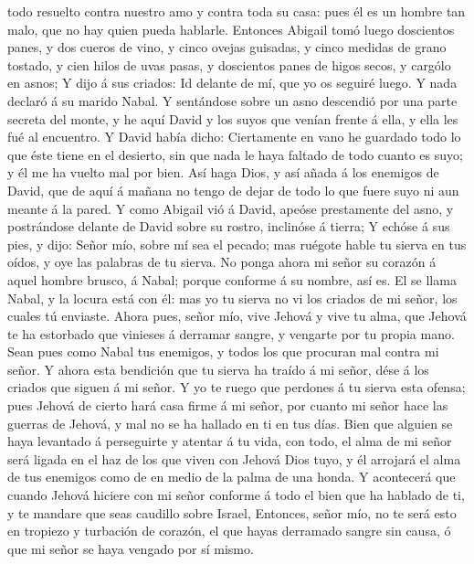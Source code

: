 todo resuelto contra nuestro amo y contra toda su casa: pues él es un
hombre tan malo, que no hay quien pueda hablarle. 
Entonces Abigail tomó luego doscientos panes, y dos cueros de vino, y
cinco ovejas guisadas, y cinco medidas de grano tostado, y cien hilos de
uvas pasas, y doscientos panes de higos secos, y cargólo en asnos;
 Y dijo á sus criados: Id delante de mí, que yo os
seguiré luego. Y nada declaró á su marido Nabal.  Y
sentándose sobre un asno descendió por una parte secreta del monte, y he
aquí David y los suyos que venían frente á ella, y ella les fué al
encuentro.  Y David había dicho: Ciertamente en vano he
guardado todo lo que éste tiene en el desierto, sin que nada le haya
faltado de todo cuanto es suyo; y él me ha vuelto mal por bien.
 Así haga Dios, y así añada á los enemigos de David, que
de aquí á mañana no tengo de dejar de todo lo que fuere suyo ni aun
meante á la pared.  Y como Abigail vió á David, apeóse
prestamente del asno, y postrándose delante de David sobre su rostro,
inclinóse á tierra;  Y echóse á sus pies, y dijo: Señor
mío, sobre mí sea el pecado; mas ruégote hable tu sierva en tus oídos, y
oye las palabras de tu sierva.  No ponga ahora mi señor
su corazón á aquel hombre brusco, á Nabal; porque conforme á su nombre,
así es. El se llama Nabal, y la locura está con él: mas yo tu sierva no
vi los criados de mi señor, los cuales tú enviaste. 
Ahora pues, señor mío, vive Jehová y vive tu alma, que Jehová te ha
estorbado que vinieses á derramar sangre, y vengarte por tu propia mano.
Sean pues como Nabal tus enemigos, y todos los que procuran mal contra
mi señor.  Y ahora esta bendición que tu sierva ha traído
á mi señor, dése á los criados que siguen á mi señor.  Y
yo te ruego que perdones á tu sierva esta ofensa; pues Jehová de cierto
hará casa firme á mi señor, por cuanto mi señor hace las guerras de
Jehová, y mal no se ha hallado en ti en tus días.  Bien
que alguien se haya levantado á perseguirte y atentar á tu vida, con
todo, el alma de mi señor será ligada en el haz de los que viven con
Jehová Dios tuyo, y él arrojará el alma de tus enemigos como de en medio
de la palma de una honda.  Y acontecerá que cuando Jehová
hiciere con mi señor conforme á todo el bien que ha hablado de ti, y te
mandare que seas caudillo sobre Israel,  Entonces, señor
mío, no te será esto en tropiezo y turbación de corazón, el que hayas
derramado sangre sin causa, ó que mi señor se haya vengado por sí mismo.
